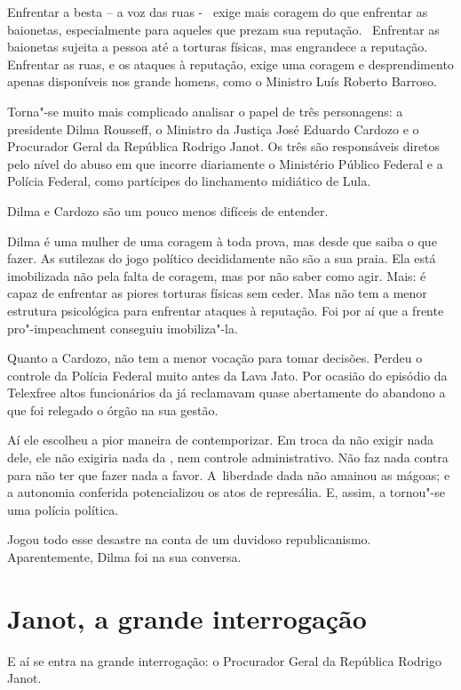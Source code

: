 Enfrentar a besta -- a voz das ruas -~ exige mais coragem do que
enfrentar as baionetas, especialmente para aqueles que prezam sua
reputação. ~Enfrentar as baionetas sujeita a pessoa até a torturas
físicas, mas engrandece a reputação. Enfrentar as ruas, e os ataques à
reputação, exige uma coragem e desprendimento apenas disponíveis nos
grande homens, como o Ministro Luís Roberto Barroso.

Torna"-se muito mais complicado analisar o papel de três personagens: a
presidente Dilma Rousseff, o Ministro da Justiça José Eduardo Cardozo e
o Procurador Geral da República Rodrigo Janot. Os três são responsáveis
diretos pelo nível do abuso em que incorre diariamente o Ministério
Público Federal e a Polícia Federal, como partícipes do linchamento
midiático de Lula.

Dilma e Cardozo são um pouco menos difíceis de entender.

Dilma é uma mulher de uma coragem à toda prova, mas desde que saiba o
que fazer. As sutilezas do jogo político decididamente não são a sua
praia. Ela está imobilizada não pela falta de coragem, mas por não saber
como agir. Mais: é capaz de enfrentar as piores torturas físicas sem
ceder. Mas não tem a menor estrutura psicológica para enfrentar ataques
à reputação. Foi por aí que a frente pro"-impeachment conseguiu
imobiliza"-la.

Quanto a Cardozo, não tem a menor vocação para tomar decisões. Perdeu o
controle da Polícia Federal muito antes da Lava Jato. Por ocasião do
episódio da Telexfree altos funcionários da  já reclamavam quase
abertamente do abandono a que foi relegado o órgão na sua gestão.

Aí ele escolheu a pior maneira de contemporizar. Em troca da  não
exigir nada dele, ele não exigiria nada da , nem controle
administrativo. Não faz nada contra para não ter que fazer nada a favor.
A~liberdade dada não amainou as mágoas; e a autonomia conferida
potencializou os atos de represália. E, assim, a  tornou"-se uma
polícia política.

Jogou todo esse desastre na conta de um duvidoso republicanismo.
Aparentemente, Dilma foi na sua conversa.

\section{Janot, a grande interrogação}

E aí se entra na grande interrogação: o Procurador Geral da República
Rodrigo Janot.

